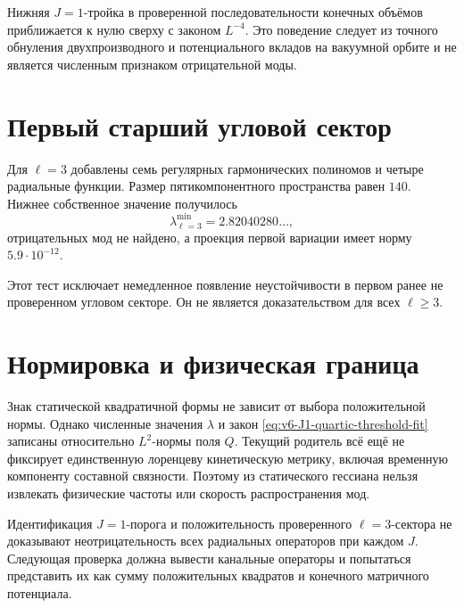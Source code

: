 \begin{theorem}
Нижняя $J=1$-тройка в проверенной последовательности конечных объёмов
приближается к нулю сверху с законом $L^{-4}$. Это поведение следует из
точного обнуления двухпроизводного и потенциального вкладов на вакуумной
орбите и не является численным признаком отрицательной моды.
\end{theorem}

\section{Первый старший угловой сектор}

Для $\ell=3$ добавлены семь регулярных гармонических полиномов и четыре
радиальные функции. Размер пятикомпонентного пространства равен $140$.
Нижнее собственное значение получилось
\begin{equation}
 \lambda_{\ell=3}^{\min}=2.82040280\ldots,
\end{equation}
отрицательных мод не найдено, а проекция первой вариации имеет норму
$5.9\cdot10^{-12}$.

Этот тест исключает немедленное появление неустойчивости в первом ранее не
проверенном угловом секторе. Он не является доказательством для всех
$\ell\ge3$.

\section{Нормировка и физическая граница}

Знак статической квадратичной формы не зависит от выбора положительной
нормы. Однако численные значения $\lambda$ и закон
\eqref{eq:v6-J1-quartic-threshold-fit} записаны относительно
$L^2$-нормы поля $Q$. Текущий родитель всё ещё не фиксирует единственную
лоренцеву кинетическую метрику, включая временную компоненту составной
связности. Поэтому из статического гессиана нельзя извлекать физические
частоты или скорость распространения мод.

\begin{nogocriterion}
Идентификация $J=1$-порога и положительность проверенного $\ell=3$-сектора
не доказывают неотрицательность всех радиальных операторов при каждом $J$.
Следующая проверка должна вывести канальные операторы и попытаться
представить их как сумму положительных квадратов и конечного матричного
потенциала.
\end{nogocriterion}

